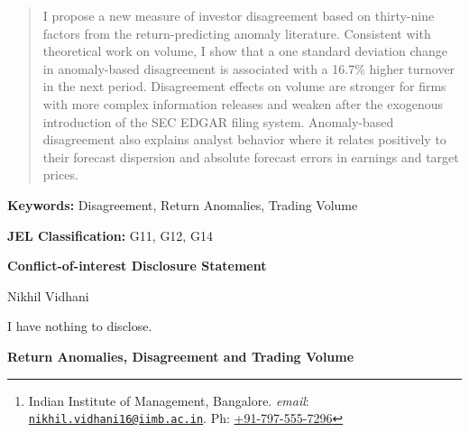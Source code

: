 \documentclass[
  12pt,
  a4paper,
  twoside,
  onecolumn]{article}
\begin{document}
\author{
  Nikhil Vidhani
  \thanks{\protect \linespread{1} \protect \selectfont \protect Indian Institute of Management, Bangalore. \emph{email}: \href{mailto:nikhil.vidhani16@iimb.ac.in?subject=Regarding - Return Anomalies, Disagreement and Trading Volume}{\nolinkurl{nikhil.vidhani16@iimb.ac.in}}. Ph: \href{tel:+91-7975557296}{+91-797-555-7296}}
}

\date{\today}

\begin{titlingpage}

\maketitle

\begin{abstract}

I propose a new measure of investor disagreement based on thirty-nine factors from the return-predicting anomaly literature. Consistent with theoretical work on volume, I show that a one standard deviation change in anomaly-based disagreement is associated with a 16.7\% higher turnover in the next period. Disagreement effects on volume are stronger for firms with more complex information releases and weaken after the exogenous introduction of the SEC EDGAR filing system. Anomaly-based disagreement also explains analyst behavior where it relates positively to their forecast dispersion and absolute forecast errors in earnings and target prices.

\end{abstract}

\noindent

\textbf{Keywords:} Disagreement, Return Anomalies, Trading Volume

\noindent

\textbf{JEL Classification:} G11, G12, G14

\end{titlingpage}

\clearpage

\begin{center}
\textbf{Conflict-of-interest Disclosure Statement}
\end{center}

Nikhil Vidhani

I have nothing to disclose.

\clearpage


\begin{center} \textbf{\LARGE Return Anomalies, Disagreement and Trading Volume} \end{center}
\end{document}
